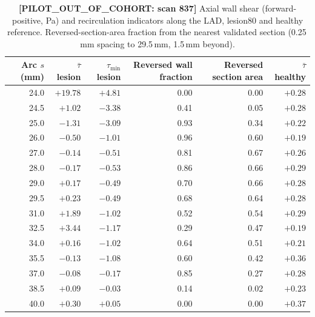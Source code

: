 \documentclass[11pt]{article}
\begin{document}
\begin{table}[H]
\centering
\caption{\textbf{[PILOT\_OUT\_OF\_COHORT: scan 837]} Axial wall shear (forward-positive, Pa) and recirculation indicators along the LAD, lesion80 and healthy reference. Reversed-section-area fraction from the nearest validated section (0.25\,mm spacing to 29.5\,mm, 1.5\,mm beyond).}
\begin{tabular}{rrrrrr}
\toprule
Arc $s$ (mm) & $\bar\tau$ lesion & $\tau_\text{min}$ lesion & Reversed wall fraction & Reversed section area & $\bar\tau$ healthy \\
\midrule
24.0 & $+19.78$ & $+4.81$ & 0.00 & 0.00 & $+0.28$ \\
24.5 & $+1.02$ & $-3.38$ & 0.41 & 0.05 & $+0.28$ \\
25.0 & $-1.31$ & $-3.09$ & 0.93 & 0.34 & $+0.22$ \\
26.0 & $-0.50$ & $-1.01$ & 0.96 & 0.60 & $+0.19$ \\
27.0 & $-0.14$ & $-0.51$ & 0.81 & 0.67 & $+0.26$ \\
28.0 & $-0.17$ & $-0.53$ & 0.86 & 0.66 & $+0.29$ \\
29.0 & $+0.17$ & $-0.49$ & 0.70 & 0.66 & $+0.28$ \\
29.5 & $+0.23$ & $-0.49$ & 0.68 & 0.64 & $+0.28$ \\
31.0 & $+1.89$ & $-1.02$ & 0.52 & 0.54 & $+0.29$ \\
32.5 & $+3.44$ & $-1.17$ & 0.29 & 0.47 & $+0.19$ \\
34.0 & $+0.16$ & $-1.02$ & 0.64 & 0.51 & $+0.21$ \\
35.5 & $-0.13$ & $-1.08$ & 0.60 & 0.42 & $+0.36$ \\
37.0 & $-0.08$ & $-0.17$ & 0.85 & 0.27 & $+0.28$ \\
38.5 & $+0.09$ & $-0.03$ & 0.14 & 0.02 & $+0.23$ \\
40.0 & $+0.30$ & $+0.05$ & 0.00 & 0.00 & $+0.37$ \\
\bottomrule
\end{tabular}
\end{table}
\end{document}
